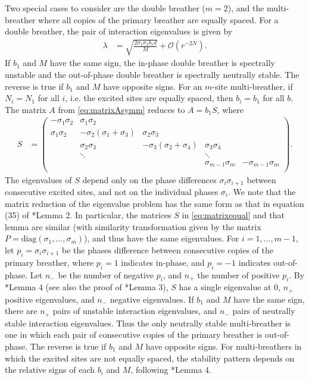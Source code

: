 \documentclass[12pt,reqno]{amsart}
\theoremstyle{definition}
\begin{document}
Two special cases to consider are the double breather ($m=2$), and the multi-breather where all copies of the primary breather are equally spaced. For a double breather, the pair of interaction eigenvalues is given by
\begin{align}\label{eq:inteigsdouble}
\lambda &= \sqrt{\frac{2 \sigma_1 \sigma_2 b_1 d}{M}} + \mathcal{O}(r^{-2N}).
\end{align}
If $b_1$ and $M$ have the same sign, the in-phase double breather is spectrally unstable and the out-of-phase double breather is spectrally neutrally stable. The reverse is true if $b_1$ and $M$ have opposite signs. For an $m$-site multi-breather, if $N_i = N_1$ for all $i$, i.e. the excited sites are equally spaced, then $b_i = b_1$ for all $b$. The matrix $A$ from \cref{eq:matrixAsymm} reduces to $A = b_1 S$, where 
\begin{align}\label{eq:matrixequal}
S &= \begin{pmatrix}
-\sigma_1 \sigma_2 & \sigma_1 \sigma_2 & & & \\
\sigma_1 \sigma_2 & -\sigma_2(\sigma_1+\sigma_3) & \sigma_2 \sigma_3 \\
& \sigma_2 \sigma_3 & -\sigma_3(\sigma_2+\sigma_4) & \sigma_3 \sigma_4 \\
& \ddots & & \ddots \\
& & & \sigma_{m-1}\sigma_m & -\sigma_{m-1}\sigma_m  \\
\end{pmatrix}.
\end{align}
The eigenvalues of $S$ depend only on the phase differences $\sigma_i \sigma_{i+1}$ between consecutive excited sites, and not on the individual phases $\sigma_i$. We note that the matrix reduction of the eigenvalue problem has the same form as that in equation (35) of \cite{Pelinovsky2012}*{Lemma 2}. In particular, the matrices $S$ in \cref{eq:matrixequal} and that lemma are similar (with similarity transformation given by the matrix $P = \text{diag}(\sigma_1, \dots, \sigma_m)$), and thus have the same eigenvalues. For $i = 1, \dots, m-1$, let $p_i = \sigma_i\sigma_{i+1}$ be the phases difference between consecutive copies of the primary breather, where $p_i = 1$ indicates in-phase, and $p_i = -1$ indicates out-of-phase. Let $n_-$ be the number of negative $p_i$, and $n_+$ the number of positive $p_i$. By \cite{Sandstede1998}*{Lemma 4} (see also the proof of \cite{Pelinovsky2012}*{Lemma 3}), $S$ has a single eigenvalue at 0, $n_+$ positive eigenvalues, and $n_-$ negative eigenvalues. If $b_1$ and $M$ have the same sign, there are $n_+$ pairs of unstable interaction eigenvalues, and $n_-$ pairs of neutrally stable interaction eigenvalues. Thus the only neutrally stable multi-breather is one in which each pair of consecutive copies of the primary breather is out-of-phase. The reverse is true if $b_1$ and $M$ have opposite signs. For multi-breathers in which the excited sites are not equally spaced, the stability pattern depends on the relative signs of each $b_i$ and $M$, following \cite{Sandstede1998}*{Lemma 4}.
\end{document}
